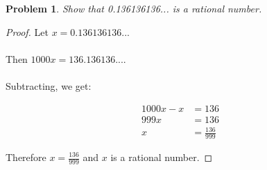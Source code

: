 \documentclass{article}
\newtheorem{problem}{Problem}
\begin{document}
\begin{problem}
Show that 0.136136136... is a rational number.
\end{problem}

\begin{proof}
Let $x = 0.136136136...$ 
\\
\\
Then $1000x = 136.136136...$. 
\\
\\
Subtracting, we get:

\begin{align*}
1000x - x &= 136 \\
999x &= 136 \\
x &= \frac{136}{999}
\end{align*}

Therefore $x = \displaystyle \frac{136}{999}$ and $x$ is a rational number.
\end{proof}
\end{document}
